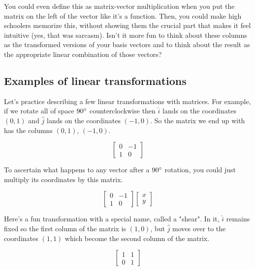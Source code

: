 You could even define this as matrix-vector multiplication when you put the
matrix on the left of the vector like it's a function. Then, you could make high
schoolers memorize this, without showing them the crucial part that makes it
feel intuitive (yes, that was sarcasm). Isn't it more fun to think about these
columns as the transformed versions of your basis vectors and to think about the
result as the appropriate linear combination of those vectors?

\subsection{Examples of linear transformations}

Let's practice describing a few linear transformations with matrices. For
example, if we rotate all of space $90\degree$ counterclockwise then $\hat{i}$
lands on the coordinates $(0, 1)$ and $\hat{j}$ lands on the coordinates
$(-1, 0)$. So the matrix we end up with has the columns $(0, 1)$, $(-1, 0)$.

\begin{equation*}
  \begin{bmatrix}
    0 & -1 \\
    1 & 0
  \end{bmatrix}
\end{equation*}

To ascertain what happens to any vector after a $90\degree$ rotation, you could
just multiply its coordinates by this matrix.

\begin{equation*}
  \begin{bmatrix}
    0 & -1 \\
    1 & 0
  \end{bmatrix} \begin{bmatrix}
    x \\
    y
  \end{bmatrix}
\end{equation*}

Here's a fun transformation with a special name, called a "shear". In it,
$\hat{i}$ remains fixed so the first column of the matrix is $(1, 0)$, but
$\hat{j}$ moves over to the coordinates $(1, 1)$ which become the second column
of the matrix.

\begin{equation*}
  \begin{bmatrix}
    1 & 1 \\
    0 & 1
  \end{bmatrix}
\end{equation*}

